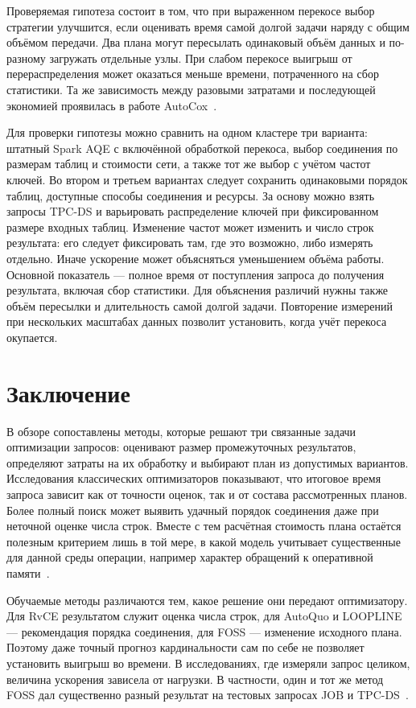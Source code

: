 \documentclass[a4paper, final]{article}
\begin{document}
	Проверяемая гипотеза состоит в том, что при выраженном перекосе выбор стратегии улучшится, если оценивать время самой долгой задачи наряду с общим объёмом передачи. Два плана могут пересылать одинаковый объём данных и по-разному загружать отдельные узлы. При слабом перекосе выигрыш от перераспределения может оказаться меньше времени, потраченного на сбор статистики. Та же зависимость между разовыми затратами и последующей экономией проявилась в работе AutoCox~\cite{coflop2023,prpq2017,kassela2025,flowjoin2026,rahman2026}.
	
	Для проверки гипотезы можно сравнить на одном кластере три варианта: штатный Spark AQE с включённой обработкой перекоса, выбор соединения по размерам таблиц и стоимости сети, а также тот же выбор с учётом частот ключей. Во втором и третьем вариантах следует сохранить одинаковыми порядок таблиц, доступные способы соединения и ресурсы. За основу можно взять запросы TPC-DS и варьировать распределение ключей при фиксированном размере входных таблиц. Изменение частот может изменить и число строк результата: его следует фиксировать там, где это возможно, либо измерять отдельно. Иначе ускорение может объясняться уменьшением объёма работы. Основной показатель --- полное время от поступления запроса до получения результата, включая сбор статистики. Для объяснения различий нужны также объём пересылки и длительность самой долгой задачи. Повторение измерений при нескольких масштабах данных позволит установить, когда учёт перекоса окупается.
	
	\newpage
	\section*{Заключение}
	
	В обзоре сопоставлены методы, которые решают три связанные задачи оптимизации запросов: оценивают размер промежуточных результатов, определяют затраты на их обработку и выбирают план из допустимых вариантов. Исследования классических оптимизаторов показывают, что итоговое время запроса зависит как от точности оценок, так и от состава рассмотренных планов. Более полный поиск может выявить удачный порядок соединения даже при неточной оценке числа строк. Вместе с тем расчётная стоимость плана остаётся полезным критерием лишь в той мере, в какой модель учитывает существенные для данной среды операции, например характер обращений к оперативной памяти~\cite{leis2015,manegold2000}.
	
	Обучаемые методы различаются тем, какое решение они передают оптимизатору. Для RvCE результатом служит оценка числа строк, для AutoQuo и LOOPLINE --- рекомендация порядка соединения, для FOSS --- изменение исходного плана. Поэтому даже точный прогноз кардинальности сам по себе не позволяет установить выигрыш во времени. В исследованиях, где измеряли запрос целиком, величина ускорения зависела от нагрузки. В частности, один и тот же метод FOSS дал существенно разный результат на тестовых запросах JOB и TPC-DS~\cite{wang2024,autoquo2024,loopline2025,foss2024}.
	
\end{document}

